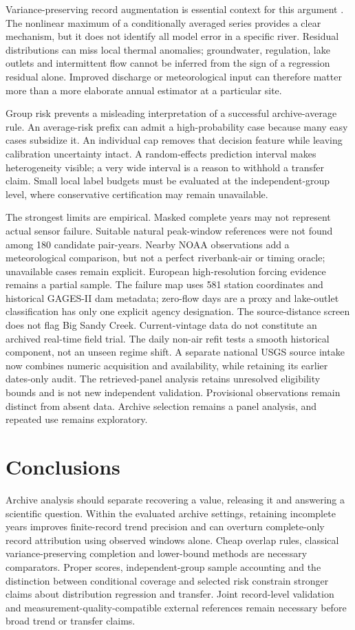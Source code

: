 \documentclass[draft,linenumbers]{agujournal2025}
\begin{document}
Variance-preserving record augmentation is essential context for this argument \cite{hirsch1982,vogel1985}. The nonlinear maximum of a conditionally averaged series provides a clear mechanism, but it does not identify all model error in a specific river. Residual distributions can miss local thermal anomalies; groundwater, regulation, lake outlets and intermittent flow cannot be inferred from the sign of a regression residual alone. Improved discharge or meteorological input can therefore matter more than a more elaborate annual estimator at a particular site.

Group risk prevents a misleading interpretation of a successful archive-average rule. An average-risk prefix can admit a high-probability case because many easy cases subsidize it. An individual cap removes that decision feature while leaving calibration uncertainty intact. A random-effects prediction interval makes heterogeneity visible; a very wide interval is a reason to withhold a transfer claim. Small local label budgets must be evaluated at the independent-group level, where conservative certification may remain unavailable.

The strongest limits are empirical. Masked complete years may not represent actual sensor failure. Suitable natural peak-window references were not found among 180 candidate pair-years. Nearby NOAA observations add a meteorological comparison, but not a perfect riverbank-air or timing oracle; unavailable cases remain explicit. European high-resolution forcing evidence remains a partial sample. The failure map uses 581 station coordinates and historical GAGES-II dam metadata; zero-flow days are a proxy and lake-outlet classification has only one explicit agency designation. The source-distance screen does not flag Big Sandy Creek. Current-vintage data do not constitute an archived real-time field trial. The daily non-air refit tests a smooth historical component, not an unseen regime shift. A separate national USGS source intake now combines numeric acquisition and availability, while retaining its earlier dates-only audit. The retrieved-panel analysis retains unresolved eligibility bounds and is not new independent validation. Provisional observations remain distinct from absent data. Archive selection remains a panel analysis, and repeated use remains exploratory.

\section{Conclusions}
Archive analysis should separate recovering a value, releasing it and answering a scientific question. Within the evaluated archive settings, retaining incomplete years improves finite-record trend precision and can overturn complete-only record attribution using observed windows alone. Cheap overlap rules, classical variance-preserving completion and lower-bound methods are necessary comparators. Proper scores, independent-group sample accounting and the distinction between conditional coverage and selected risk constrain stronger claims about distribution regression and transfer. Joint record-level validation and measurement-quality-compatible external references remain necessary before broad trend or transfer claims.
\end{document}
